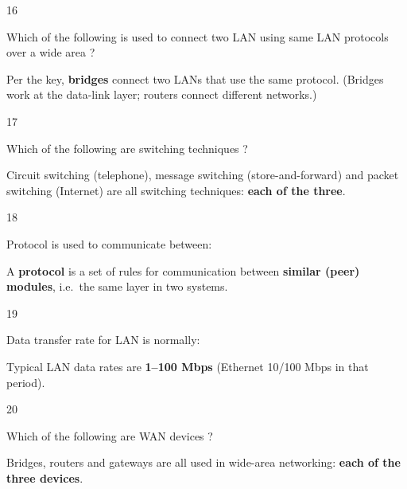 \begin{question}{16}
{Which of the following is used to connect two LAN using same LAN protocols over a wide area ?\par}
\begin{explain}
Per the key, \textbf{bridges} connect two LANs that use the same protocol. (Bridges work at the data-link layer; routers connect different networks.)
\end{explain}
\end{question}

\begin{question}{17}
{Which of the following are switching techniques ?\par}
\begin{explain}
Circuit switching (telephone), message switching (store-and-forward) and packet switching (Internet) are all switching techniques: \textbf{each of the three}.
\end{explain}
\end{question}

\begin{question}{18}
{Protocol is used to communicate between:\par}
\begin{explain}
A \textbf{protocol} is a set of rules for communication between \textbf{similar (peer) modules}, i.e.\ the same layer in two systems.
\end{explain}
\end{question}

\begin{question}{19}
{Data transfer rate for LAN is normally:\par}
\begin{explain}
Typical LAN data rates are \textbf{1--100 Mbps} (Ethernet 10/100 Mbps in that period).
\end{explain}
\end{question}

\begin{question}{20}
{Which of the following are WAN devices ?\par}
\begin{explain}
Bridges, routers and gateways are all used in wide-area networking: \textbf{each of the three devices}.
\end{explain}
\end{question}

